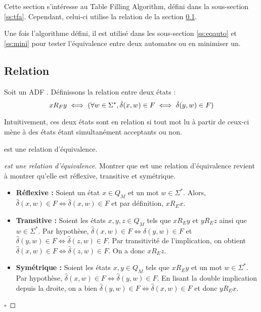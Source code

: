Cette section s'intéresse au Table Filling Algorithm, défini dans la sous-section \ref{ss:tfa}. Cependant, celui-ci utilise la relation \rf de la section \ref{ss:re}.

Une fois l'algorithme défini, il est utilisé dans les sous-section \ref{ss:eqauto} et \ref{ss:mini} pour tester l'équivalence entre deux automates ou en minimiser un.





\subsection{Relation \rf}\label{ss:re}

Soit un ADF \automaton. Définissons la relation \rf entre deux états :
$$xR_Fy \iff (\forall w \in \Sigma^*,\hat{\delta}(x,w) \in F \iff \hat{\delta}(y,w) \in F)$$

Intuitivement, ces deux états sont en relation si tout mot lu à partir de ceux-ci mène à des états étant simultanément acceptants ou non.

\begin{proposition}[\rf]
 \rf est une relation d'équivalence.
\end{proposition}

\begin{proof}[\rf est une relation d'équivalence] Montrer que \rf est une relation d'équivalence revient à montrer qu'elle est réflexive, transitive et symétrique.
 \begin{itemize}
	 \item \textbf{Réflexive :} Soient un état $x \in Q_M$ et un mot $w \in \Sigma^*$. Alors, $\hat{\delta}(x,w) \in F \iff \hat{\delta}(x,w) \in F$ et par définition, $xR_Ex$.
	 \item \textbf{Transitive :} Soient les états $x,y,z \in Q_M$ tels que $xR_Ey$ et $yR_Ez$ ainsi que $w \in \Sigma^*$. Par hypothèse, $\hat{\delta}(x,w) \in F \iff \hat{\delta}(y,w)\in F$ et $\hat{\delta}(y,w) \in F\iff \hat{\delta}(z,w) \in F$. Par transitivité de l'implication, on obtient $\hat{\delta}(x,w) \in F \iff \hat{\delta}(z,w)\in F$. On a donc $xR_Ez$.
	 \item \textbf{Symétrique : } Soient les états $x,y \in Q_M$ tels que $xR_Ey$ et un mot $w \in \Sigma^*$. Par hypothèse, $\hat{\delta}(x, w)\in F \iff \hat{\delta}(y, w)\in F$. En lisant la double implication depuis la droite, on a bien $\hat{\delta}(y, w) \in F\iff \hat{\delta}(x, w)\in F$ et donc $yR_Ex$.
 \end{itemize}
 \hfill$\square$
\end{proof}

